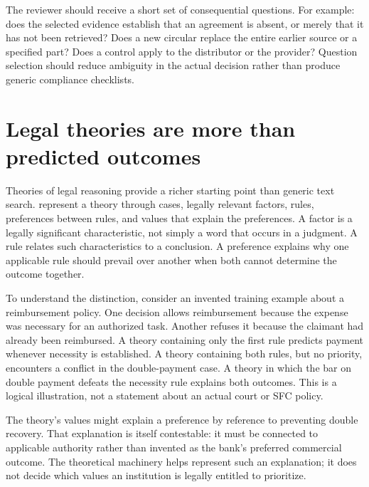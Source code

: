 
The reviewer should receive a short set of consequential questions. For example:
does the selected evidence establish that an agreement is absent, or merely that
it has not been retrieved? Does a new circular replace the entire earlier source
or a specified part? Does a control apply to the distributor or the provider?
Question selection should reduce ambiguity in the actual decision rather than
produce generic compliance checklists.

\section{Legal theories are more than predicted outcomes}
\label{merge:M05:01}


Theories of legal reasoning provide a richer starting point than generic text
search. \citet[sections 3--5]{theories2003} represent a theory through cases,
legally relevant factors, rules, preferences between rules, and values that
explain the preferences. A factor is a legally significant characteristic, not
simply a word that occurs in a judgment. A rule relates such characteristics to a
conclusion. A preference explains why one applicable rule should prevail over
another when both cannot determine the outcome together.

To understand the distinction, consider an invented training example about a
reimbursement policy. One decision allows reimbursement because the expense was
necessary for an authorized task. Another refuses it because the claimant had
already been reimbursed. A theory containing only the first rule predicts payment
whenever necessity is established. A theory containing both rules, but no
priority, encounters a conflict in the double-payment case. A theory in which the
bar on double payment defeats the necessity rule explains both outcomes. This is
a logical illustration, not a statement about an actual court or SFC policy.


The theory's values might explain a preference by reference to preventing double
recovery. That explanation is itself contestable: it must be connected to
applicable authority rather than invented as the bank's preferred commercial
outcome. The theoretical machinery helps represent such an explanation; it does
not decide which values an institution is legally entitled to prioritize.


